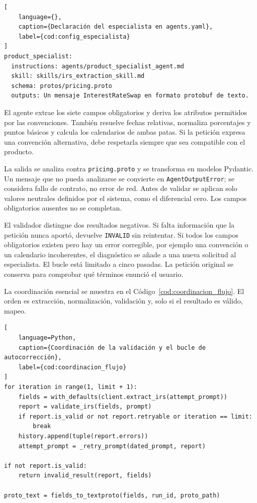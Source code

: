 \begin{lstlisting}[
    language={},
    caption={Declaración del especialista en agents.yaml},
    label={cod:config_especialista}
]
product_specialist:
  instructions: agents/product_specialist_agent.md
  skill: skills/irs_extraction_skill.md
  schema: protos/pricing.proto
  outputs: Un mensaje InterestRateSwap en formato protobuf de texto.
\end{lstlisting}

El agente extrae los siete campos obligatorios y deriva los atributos permitidos por las convenciones. También resuelve fechas relativas, normaliza porcentajes y puntos básicos y calcula los calendarios de ambas patas. Si la petición expresa una convención alternativa, debe respetarla siempre que sea compatible con el producto.

La salida se analiza contra \texttt{pricing.proto} y se transforma en modelos Pydantic. Un mensaje que no pueda analizarse se convierte en \texttt{AgentOutputError}; se considera fallo de contrato, no error de red. Antes de validar se aplican solo valores neutrales definidos por el sistema, como el diferencial cero. Los campos obligatorios ausentes no se completan.

El validador distingue dos resultados negativos. Si falta información que la petición nunca aportó, devuelve \texttt{INVALID} sin reintentar. Si todos los campos obligatorios existen pero hay un error corregible, por ejemplo una convención o un calendario incoherentes, el diagnóstico se añade a una nueva solicitud al especialista. El bucle está limitado a cinco pasadas. La petición original se conserva para comprobar qué términos enunció el usuario.

La coordinación esencial se muestra en el Código~\ref{cod:coordinacion_flujo}. El orden es extracción, normalización, validación y, solo si el resultado es válido, mapeo.

\begin{lstlisting}[
    language=Python,
    caption={Coordinación de la validación y el bucle de autocorrección},
    label={cod:coordinacion_flujo}
]
for iteration in range(1, limit + 1):
    fields = with_defaults(client.extract_irs(attempt_prompt))
    report = validate_irs(fields, prompt)
    if report.is_valid or not report.retryable or iteration == limit:
        break
    history.append(tuple(report.errors))
    attempt_prompt = _retry_prompt(dated_prompt, report)

if not report.is_valid:
    return invalid_result(report, fields)

proto_text = fields_to_textproto(fields, run_id, proto_path)
\end{lstlisting}


